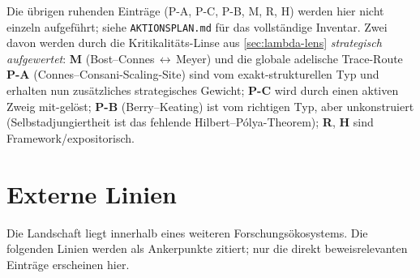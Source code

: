 \documentclass[12pt,a4paper]{article}
\theoremstyle{definition}
\theoremstyle{remark}
\begin{document}
Die übrigen ruhenden Einträge (P-A, P-C, P-B, M, R, H) werden hier nicht
einzeln aufgeführt; siehe \texttt{AKTIONSPLAN.md} für das vollständige Inventar.
Zwei davon werden durch die Kritikalitäts-Linse aus \cref{sec:lambda-lens}
\emph{strategisch aufgewertet}: \textbf{M} (Bost--Connes\,$\leftrightarrow$\,Meyer)
und die globale adelische Trace-Route \textbf{P-A} (Connes--Consani-Scaling-Site)
sind vom exakt-strukturellen Typ und erhalten nun zusätzliches strategisches
Gewicht; \textbf{P-C} wird durch einen aktiven Zweig mit-gelöst; \textbf{P-B}
(Berry--Keating) ist vom richtigen Typ, aber unkonstruiert (Selbstadjungiertheit
ist das fehlende Hilbert--P\'olya-Theorem); \textbf{R}, \textbf{H} sind
Framework/expositorisch.


\section{Externe Linien}
\label{sec:external}

Die Landschaft liegt innerhalb eines weiteren Forschungsökosystems. Die
folgenden Linien werden als Ankerpunkte zitiert; nur die direkt
beweisrelevanten Einträge erscheinen hier.
\end{document}
